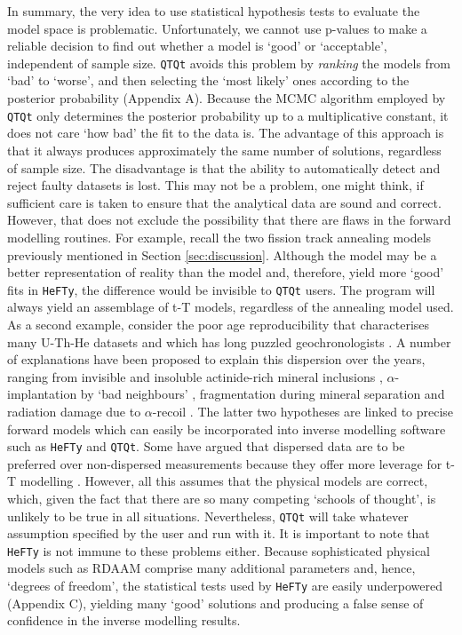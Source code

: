 \documentclass{article}
\begin{document}
In summary, the very idea to use statistical hypothesis tests to
evaluate the model space is problematic. Unfortunately, we cannot use
p-values to make a reliable decision to find out whether a model is
`good' or `acceptable', independent of sample size. {\tt QTQt} avoids
this problem by \emph{ranking} the models from `bad' to `worse', and
then selecting the `most likely' ones according to the posterior
probability (Appendix A). Because the MCMC algorithm employed by {\tt
  QTQt} only determines the posterior probability up to a
multiplicative constant, it does not care `how bad' the fit to the
data is. The advantage of this approach is that it always produces
approximately the same number of solutions, regardless of sample
size. The disadvantage is that the ability to automatically detect and
reject faulty datasets is lost.  This may not be a problem, one might
think, if sufficient care is taken to ensure that the analytical data
are sound and correct. However, that does not exclude the possibility
that there are flaws in the forward modelling routines. For example,
recall the two fission track annealing models previously mentioned in
Section \ref{sec:discussion}. Although the \cite{ketcham2007} model
may be a better representation of reality than the \cite{laslett1987}
model and, therefore, yield more `good' fits in {\tt HeFTy}, the
difference would be invisible to {\tt QTQt} users. The program will
always yield an assemblage of t-T models, regardless of the annealing
model used.  As a second example, consider the poor age
reproducibility that characterises many U-Th-He datasets and which has
long puzzled geochronologists \cite{fitzgerald2006}. A number of
explanations have been proposed to explain this dispersion over the
years, ranging from invisible and insoluble actinide-rich mineral
inclusions \cite{vermeesch2007b}, $\alpha$-implantation by `bad
neighbours' \cite{spiegel2009}, fragmentation during mineral
separation \cite{brown2013} and radiation damage due to
$\alpha$-recoil \cite{flowers2009}. The latter two hypotheses are
linked to precise forward models which can easily be incorporated into
inverse modelling software such as {\tt HeFTy} and {\tt QTQt}. Some
have argued that dispersed data are to be preferred over non-dispersed
measurements because they offer more leverage for t-T modelling
\cite{beucher2013}.  However, all this assumes that the physical
models are correct, which, given the fact that there are so many
competing `schools of thought', is unlikely to be true in all
situations. Nevertheless, {\tt QTQt} will take whatever assumption
specified by the user and run with it. It is important to note that
{\tt HeFTy} is not immune to these problems either. Because
sophisticated physical models such as RDAAM comprise many additional
parameters and, hence, `degrees of freedom', the statistical tests
used by {\tt HeFTy} are easily underpowered (Appendix C), yielding
many `good' solutions and producing a false sense of confidence in the
inverse modelling results.\\
\end{document}
